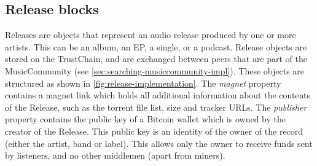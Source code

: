 \subsection{Release blocks}
Releases are objects that represent an audio release produced by one or more artists. This can be an album, an EP, a single, or a podcast. Release objects are stored on the TrustChain, and are exchanged between peers that are part of the MusicCommunity (see \ref{sec:searching-musiccommunity-impl}). These objects are structured as shown in \ref{fig:release-implementation}. The \textit{magnet} property contains a magnet link which holds all additional information about the contents of the Release, such as the torrent file list, size and tracker URLs. The \textit{publisher} property contains the public key of a Bitcoin wallet which is owned by the creator of the Release. This public key is an identity of the owner of the record (either the artist, band or label). This allows only the owner to receive funds sent by listeners, and no other middlemen (apart from miners).
